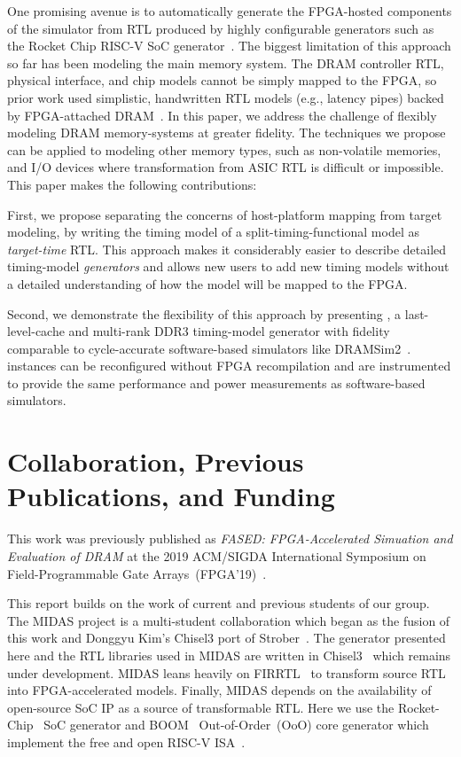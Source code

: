 One promising avenue is to automatically generate the FPGA-hosted
components of the simulator from RTL produced by highly configurable
generators such as the Rocket Chip RISC-V SoC generator~\cite{rocketchip}. The
biggest limitation of this approach so far has been modeling the main
memory system.  The DRAM controller RTL, physical interface, and
chip models cannot be simply mapped to the FPGA, so
prior work used simplistic, handwritten RTL models (e.g.,
latency pipes) backed by FPGA-attached DRAM~\cite{khanms}.
In this paper, we address the challenge of flexibly modeling DRAM
memory-systems at greater fidelity.  The techniques we propose can be
applied to modeling other memory types, such as
non-volatile memories, and I/O devices where transformation from ASIC
RTL is difficult or impossible.  This paper makes the following
contributions:

First, we propose separating the concerns of host-platform mapping
from target modeling, by writing the timing model of a
split-timing-functional model as \emph{target-time} RTL.  This
approach makes it considerably easier to describe detailed
timing-model \emph{generators} and allows new users to add new timing
models without a detailed understanding of how the model will be
mapped to the FPGA.

Second, we demonstrate the flexibility of this approach by presenting \PNAME, a
last-level-cache and multi-rank DDR3 timing-model generator with fidelity comparable to
cycle-accurate software-based simulators like DRAMSim2~\cite{dramsim}. \PNAME
instances can be reconfigured without FPGA recompilation and are instrumented
to provide the same performance and power measurements as software-based
simulators.


\section{Collaboration, Previous Publications, and Funding}

This work was previously published as \emph{FASED: FPGA-Accelerated Simuation
and Evaluation of DRAM} at the 2019 ACM/SIGDA International
Symposium on Field-Programmable Gate Arrays~(FPGA'19)~\cite{fased}.

This report builds on the work of current and previous students of our group.
The MIDAS project is a multi-student collaboration which began as the fusion of
this work and Donggyu Kim's Chisel3 port of Strober~\cite{strober}. The
generator presented here and the RTL libraries used in MIDAS are written in
Chisel3~\cite{Chisel} which remains under development. MIDAS leans
heavily on FIRRTL~\cite{firrtl} to transform source RTL into FPGA-accelerated
models.  Finally, MIDAS depends on the availability of open-source SoC IP as a
source of transformable RTL. Here we use the Rocket-Chip~\cite{rocketchip} SoC
generator and BOOM~\cite{boom} Out-of-Order~(OoO) core generator which
implement the free and open RISC-V ISA~\cite{riscv}.

